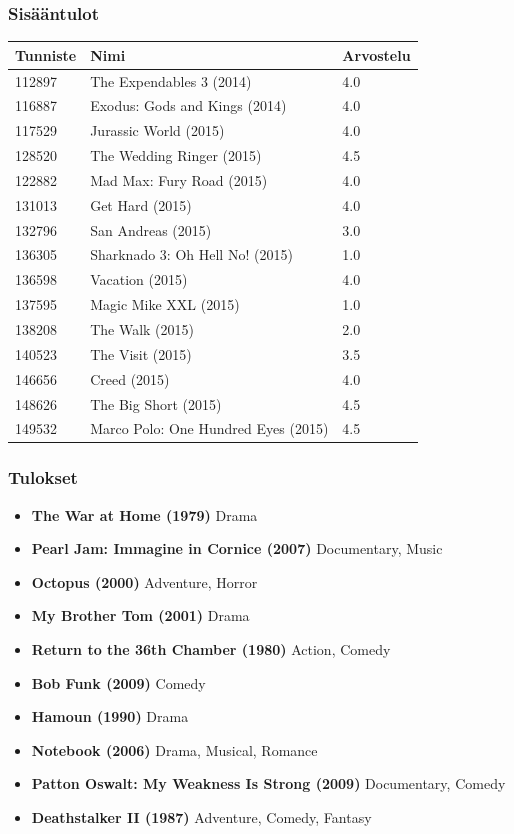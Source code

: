 \documentclass{beamer}
\begin{document}
\begin{frame}
\frametitle{Sisääntulot}

\begin{tabular}{lll}
	Tunniste & Nimi & Arvostelu \\ \hline
	112897 & The Expendables 3 (2014) & 4.0 \\
	116887 & Exodus: Gods and Kings (2014) & 4.0 \\
	117529 & Jurassic World (2015) & 4.0 \\
	128520 & The Wedding Ringer (2015) & 4.5 \\
	122882 & Mad Max: Fury Road (2015) & 4.0 \\
	131013 & Get Hard (2015) & 4.0 \\
	132796 & San Andreas (2015) & 3.0 \\
	136305 & Sharknado 3: Oh Hell No! (2015) & 1.0 \\
	136598 & Vacation (2015) & 4.0 \\
	137595 & Magic Mike XXL (2015) & 1.0 \\
	138208 & The Walk (2015) & 2.0 \\
	140523 & The Visit (2015) & 3.5 \\
	146656 & Creed (2015) & 4.0 \\
	148626 & The Big Short (2015) & 4.5 \\
	149532 & Marco Polo: One Hundred Eyes (2015) & 4.5 \\
\end{tabular}

\end{frame}


\begin{frame}
\frametitle{Tulokset}

\begin{itemize}
	\item \textbf{The War at Home (1979)} Drama
	\item \textbf{Pearl Jam: Immagine in Cornice (2007)} Documentary, Music
	\item \textbf{Octopus (2000)} Adventure, Horror
	\item \textbf{My Brother Tom (2001)} Drama
	\item \textbf{Return to the 36th Chamber (1980)} Action, Comedy
	\item \textbf{Bob Funk (2009)} Comedy
	\item \textbf{Hamoun (1990)} Drama
	\item \textbf{Notebook (2006)} Drama, Musical, Romance
	\item \textbf{Patton Oswalt: My Weakness Is Strong (2009)} Documentary, Comedy
	\item \textbf{Deathstalker II (1987)} Adventure, Comedy, Fantasy
\end{itemize}

\end{frame}
\end{document}
